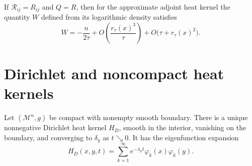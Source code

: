 \begin{lemma}
\label{lem:chow-iii-adjoint-parametrix-ricci-asymptotics}


If \(\mathcal R_{ij}=R_{ij}\) and \(Q=R\), then for the approximate adjoint
heat kernel the quantity \(W\) defined from its logarithmic density satisfies
\[
 W=-\frac{n}{2\tau}
 +O\!\left(\frac{r_\tau(x)^3}{\tau}\right)
 +O\bigl(\tau+r_\tau(x)^2\bigr).
\]
\end{lemma}

\section{Dirichlet and noncompact heat kernels}

\begin{theorem}
\label{thm:chow-iii-static-dirichlet-heat-kernel}

Let \((\mathcal M^n,g)\) be compact with nonempty smooth boundary.  There is a
unique nonnegative Dirichlet heat kernel \(H_D\), smooth in the interior,
vanishing on the boundary, and converging to \(\delta_y\) as \(t\searrow0\).
It has the eigenfunction expansion
\[
 H_D(x,y,t)=\sum_{k=1}^\infty e^{-\lambda_kt}\varphi_k(x)\varphi_k(y).
\]
\end{theorem}


